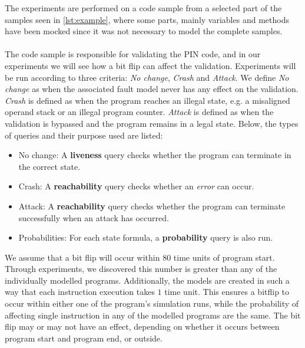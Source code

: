 The experiments are performed on a code sample from a selected part of the \jc samples seen in \cref{lst:example}, where some parts, mainly variables and methods have been mocked since it was not necessary to model the complete samples.\\\\
The code sample is responsible for validating the PIN code, and in our experiments we will see how a bit flip can affect the validation. Experiments will be run according to three criteria: \textit{No change}, \textit{Crash} and \textit{Attack}. We define \textit{No change} as when the associated fault model never has any effect on the validation. \textit{Crash} is defined as when the program reaches an illegal state, e.g. a misaligned operand stack or an illegal program counter. \textit{Attack} is defined as when the validation is bypassed and the program remains in a legal state. Below, the types of queries and their purpose used are listed:

\begin{itemize}
\item No change: A \textbf{liveness} query checks whether the program can terminate in the correct state.
\item Crash: A \textbf{reachability} query checks whether an \textit{error} can occur.
\item Attack: A \textbf{reachability} query checks whether the program can terminate successfully when an attack has occurred.
\item Probabilities: For each state formula, a \textbf{probability} query is also run.
\end{itemize}

\noindent We assume that a bit flip will occur within $80$ time units of program start. Through experiments, we discovered this number is greater than any of the individually modelled programs. Additionally, the models are created in such a way that each instruction execution takes $1$ time unit. This ensures a bitflip to occur within either one of the program's simulation runs, while the probability of affecting single instruction in any of the modelled programs are the same. The bit flip may or may not have an effect, depending on whether it occurs between program start and program end, or outside.